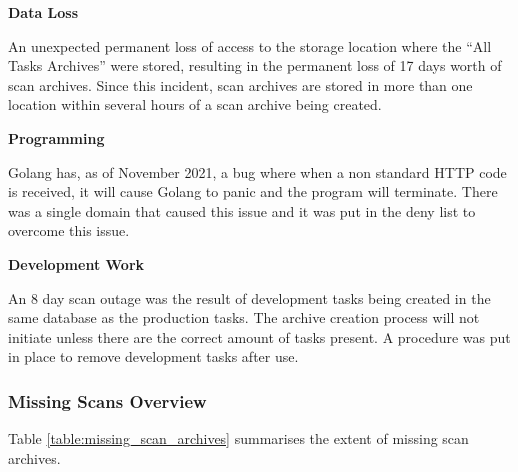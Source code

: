 \documentclass{mscreport}
\begin{document}
\vspace{0.6cm} \noindent
\textbf{Data Loss}

\vspace{0.2cm} \noindent
An unexpected permanent loss of access to the storage location where the ``All Tasks Archives'' were stored, resulting in the permanent loss of 17 days worth of scan archives. Since this incident, scan archives are stored in more than one location within several hours of a scan archive being created.

\vspace{0.6cm} \noindent
\textbf{Programming}

\vspace{0.2cm} \noindent
Golang has, as of November 2021, a bug \cite{noauthor_undated-kp} where when a non standard HTTP code is received, it will cause Golang to panic and the program will terminate. There was a single domain that caused this issue and it was put in the deny list to overcome this issue.

\vspace{0.6cm} \noindent
\textbf{Development Work}

\vspace{0.2cm} \noindent
An 8 day scan outage was the result of development tasks being created in the same database as the production tasks. The archive creation process will not initiate unless there are the correct amount of tasks present. A procedure was put in place to remove development tasks after use.

\subsubsection{Missing Scans Overview}
\label{subsection:missing_scans_overview}

Table \ref{table:missing_scan_archives} summarises the extent of missing scan archives.
\end{document}
